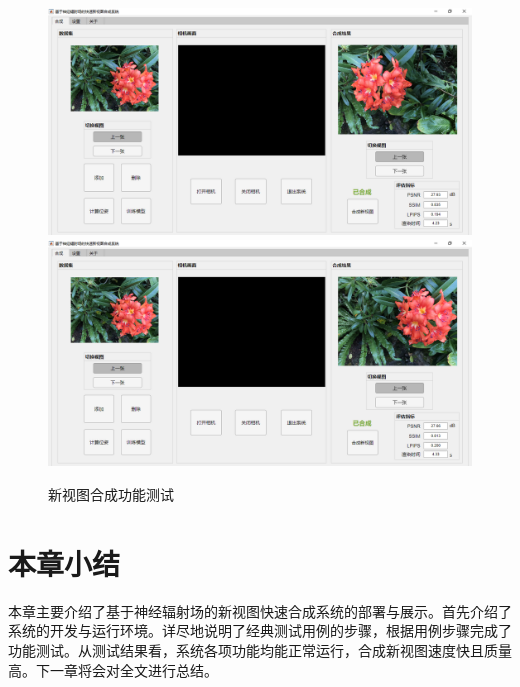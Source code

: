 \begin{figure}[bhtp]
  \subcaptionbox{\label{fig:viewsynthesis-g}}
    {\includegraphics[width=0.45\linewidth]{figures/system/3-g.png}}
    \subcaptionbox{\label{fig:viewsynthesis-h}}
    {\includegraphics[width=0.45\linewidth]{figures/system/3-h.png}}
  \caption{新视图合成功能测试}
  \label{fig:viewsynthesis}
\end{figure}
\newpage
\section{本章小结}
本章主要介绍了基于神经辐射场的新视图快速合成系统的部署与展示。首先介绍了系统的开发与运行环境。详尽地说明了经典测试用例的步骤，根据用例步骤完成了功能测试。从测试结果看，系统各项功能均能正常运行，合成新视图速度快且质量高。下一章将会对全文进行总结。








